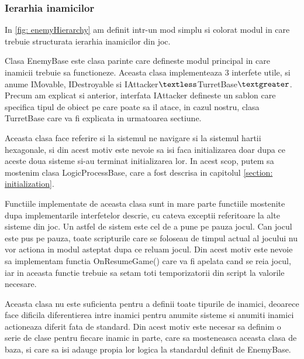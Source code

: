 \documentclass[12pt, a4paper]{article}
\begin{document}
	\subsubsection{Ierarhia inamicilor}
	

	In \ref{fig: enemyHierarchy} am definit intr-un mod simplu si colorat modul in care trebuie structurata ierarhia inamicilor din joc.
	
	Clasa EnemyBase este clasa parinte care defineste modul principal in care inamicii trebuie sa functioneze. Aceasta clasa implementeaza 3 interfete utile, si anume IMovable, IDestroyable si IAttacker$\textless$TurretBase$\textgreater$. Precum am explicat si anterior, interfata IAttacker defineste un sablon care specifica tipul de obiect pe care poate sa il atace, in cazul nostru, clasa TurretBase care va fi explicata in urmatoarea sectiune.
	
	Aceasta clasa face referire si la sistemul ne navigare si la sistemul hartii hexagonale, si din acest motiv este nevoie sa isi faca initializarea doar dupa ce aceste doua sisteme si-au terminat initializarea lor. In acest scop, putem sa mostenim clasa LogicProcessBase, care a fost descrisa in capitolul \ref{section: initialization}.
	
	Functiile implementate de aceasta clasa sunt in mare parte functiile mostenite dupa implementarile interfetelor descrie, cu cateva exceptii referitoare la alte sisteme din joc. Un astfel de sistem este cel de a pune pe pauza jocul. Can jocul este pus pe pauza, toate scripturile care se foloseau de timpul actual al jocului nu vor actiona in modul asteptat dupa ce reluam jocul. Din acest motiv este nevoie sa implementam functia OnResumeGame() care va fi apelata cand se reia jocul, iar in aceasta functie trebuie sa setam toti temporizatorii din script la valorile necesare.
	
	Aceasta clasa nu este suficienta pentru a definii toate tipurile de inamici, deoarece face dificila diferentierea intre inamici pentru anumite sisteme si anumiti inamici actioneaza diferit fata de standard. Din acest motiv este necesar sa definim o serie de clase pentru fiecare inamic in parte, care sa mosteneasca aceasta clasa de baza, si care sa isi adauge propia lor logica la standardul definit de EnemyBase.
	
\end{document}
